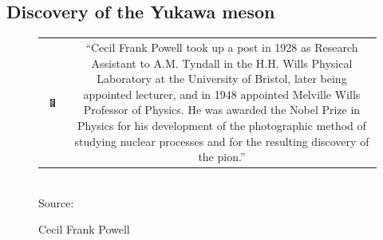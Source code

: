 \subsection{Discovery of the Yukawa meson}
\begin{figure}
\caption{Cecil Frank Powell}
\begin{tabular}{cc}
\parbox{0.32\textwidth}{
\includegraphics[width=0.3\textwidth]{fig/strongforce/180px-Cecil_Powell.jpg}
}&
\parbox{0.66\textwidth}{\textsf{\small
    ``Cecil Frank Powell took up a post in 1928 as Research Assistant to A.M. Tyndall in the H.H. Wills Physical Laboratory at the University of Bristol, later being appointed lecturer, and in 1948 appointed Melville Wills Professor of Physics. He was awarded the Nobel Prize in Physics for his development of the photographic method of studying nuclear processes and for the resulting discovery of the pion.'' 
}}
\end{tabular}
\\  \textsf{Source: }
\end{figure}

